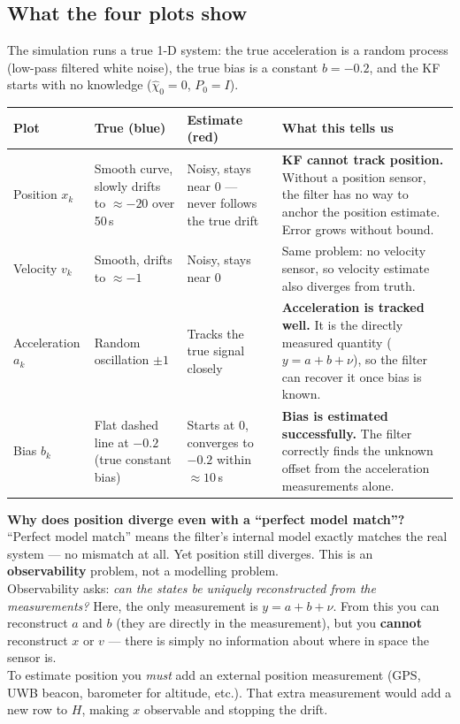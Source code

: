\documentclass[12pt, a4paper]{article}
\begin{document}
\subsection*{What the four plots show}

The simulation runs a true 1-D system: the true acceleration is a
random process (low-pass filtered white noise), the true bias is a
constant $b = {-0.2}$, and the KF starts with no knowledge
($\hat{\chi}_0 = 0$, $P_0 = I$).
\begin{center}
\renewcommand{\arraystretch}{1.6}
\begin{tabular}{p{2cm} p{3.5cm} p{3.5cm} p{5cm}}
  \toprule
  \textbf{Plot} & \textbf{True (blue)} & \textbf{Estimate (red)} &
  \textbf{What this tells us} \\
  \midrule
  Position $x_k$ &
    Smooth curve, slowly drifts to $\approx -20$ over 50\,s &
    Noisy, stays near 0 --- never follows the true drift &
    \textbf{KF cannot track position.} Without a position sensor, the
    filter has no way to anchor the position estimate. Error grows
    without bound. \\
  Velocity $v_k$ &
    Smooth, drifts to $\approx -1$ &
    Noisy, stays near 0 &
    Same problem: no velocity sensor, so velocity estimate also
    diverges from truth. \\
  Acceleration $a_k$ &
    Random oscillation $\pm 1$ &
    Tracks the true signal closely &
    \textbf{Acceleration is tracked well.} It is the directly measured
    quantity ($y = a + b + \nu$), so the filter can recover it once
    bias is known. \\
  Bias $b_k$ &
    Flat dashed line at $-0.2$ (true constant bias) &
    Starts at 0, converges to $-0.2$ within $\approx 10$\,s &
    \textbf{Bias is estimated successfully.} The filter correctly
    finds the unknown offset from the acceleration measurements alone.\\
  \bottomrule
\end{tabular}
\end{center}

\begin{warnbox}
  \textbf{Why does position diverge even with a ``perfect model match''?}\\
  ``Perfect model match'' means the filter's internal model exactly
  matches the real system --- no mismatch at all.
  Yet position still diverges.
  This is an \textbf{observability} problem, not a modelling problem.\\[4pt]
  Observability asks: \emph{can the states be uniquely reconstructed
  from the measurements?}
  Here, the only measurement is $y = a + b + \nu$.
  From this you can reconstruct $a$ and $b$ (they are directly in the
  measurement), but you \textbf{cannot} reconstruct $x$ or $v$ ---
  there is simply no information about where in space the sensor is.\\[4pt]
  To estimate position you \emph{must} add an external position
  measurement (GPS, UWB beacon, barometer for altitude, etc.).
  That extra measurement would add a new row to $H$, making $x$
  observable and stopping the drift.
\end{warnbox}
\end{document}
